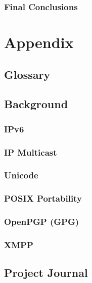 \documentclass[a4paper,12pt]{report}
\begin{document}
\section{Final Conclusions}


\part*{Appendix}

\appendix


\chapter{Glossary}




\chapter{Background}

\section{IPv6}

\section{IP Multicast}

\section{Unicode}

\section{POSIX Portability}

\section{OpenPGP (GPG)}

\section{XMPP}


\chapter{Project Journal}
\end{document}
